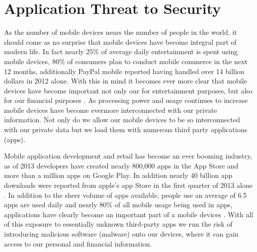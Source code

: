 \documentclass{sig-alternate}
\begin{document}
		
%		



\section{Application Threat to Security} 
As the number of mobile devices nears the number of people in the world, it should come as no surprise that mobile devices have become integral part of modern life. In fact nearly 25\% of average daily entertainment is spent using mobile devices, 80\% of consumers plan to conduct mobile commerce in the next 12 months, additionally PayPal mobile reported having handled over 14 billion dollars in 2012 alone. With this in mind it becomes ever more clear that mobile devices have become important not only our for entertainment purposes, but also for our financial purposes \cite{mobile-usage}. As processing power and usage continues to increase mobile devices have become evermore interconnected with our private information.  Not only do we allow our mobile devices to be so interconnected with our private data but we load them with numerous third party applications (apps).   

 Mobile application development and retail has become an ever booming industry, as of 2013 developers have created nearly 800,000 apps in the App Store and more than a million apps on Google Play. In addition nearly 40 billion app downloads were reported from apple's app Store in the first quarter of 2013 alone \cite{Keylogging}. In addition to the sheer volume of apps available, people use an average of 6.5 apps are used daily and nearly 80\% of all mobile usage being used in apps, applications have clearly become an important part of a mobile devices \cite{mobile-usage}.  With all of this exposure to essentially unknown third-party apps we run the risk of introducing malicious software (malware) onto our devices, where it can gain access to our personal and financial information.
\end{document}
